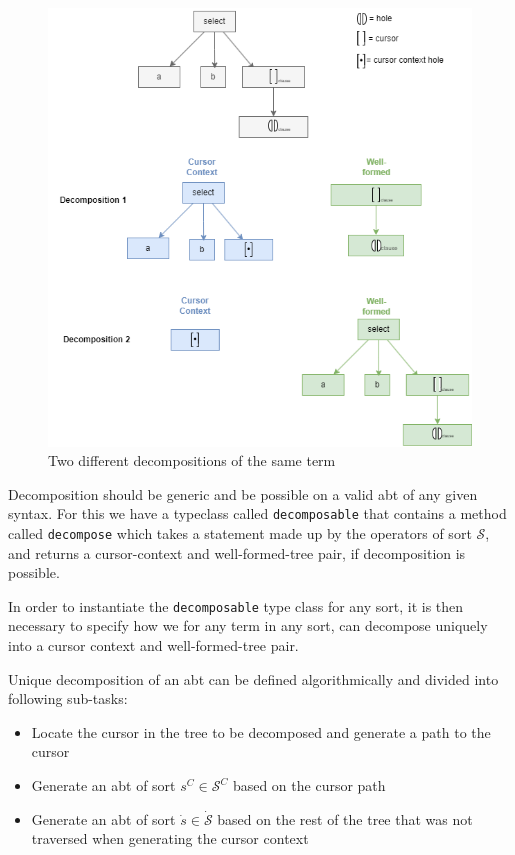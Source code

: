 \begin{figure}[H]
  \centering
  \includegraphics[width=\textwidth]{img/slq-decompose-ex.drawio.png}
  \caption{Two different decompositions of the same term}
  \label{fig:sql-decomp-ex}
\end{figure}

Decomposition should be generic and be possible on a valid abt of any given syntax.
For this we have a typeclass called \texttt{decomposable} that contains a
method called \texttt{decompose} which takes a statement made up by the
operators of sort $\mathcal{S}$, and returns a cursor-context and well-formed-tree pair,
if decomposition is possible.

In order to instantiate the \texttt{decomposable} type class for any sort,
it is then necessary to specify how we for any term in any sort,
can decompose uniquely into a cursor context and well-formed-tree pair.

Unique decomposition of an abt can be defined algorithmically and divided
into following sub-tasks:
\begin{itemize}
  \item Locate the cursor in the tree to be decomposed and generate a path to the cursor
  \item Generate an abt of sort $s^C \in \mathcal{S}^C$ based on the cursor path
  \item Generate an abt of sort $\dot{s} \in \dot{\mathcal{S}}$
        based on the rest of the tree that was not traversed
        when generating the cursor context
\end{itemize}

